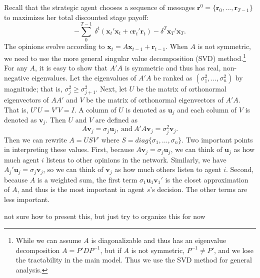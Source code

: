 \documentclass{article}
\newcommand{\x}{\mathbf{x}}
\newcommand{\re}{\mathbf{r}}
\newcommand{\ve}{\mathbf{v}}
\newcommand{\ue}{\mathbf{u}}
\newcommand{\wl}[1]{{\color{blue} #1}}
\begin{document}
Recall that the strategic agent chooses a sequence of messages $\re^0=\{\re_0,\ldots,\re_{T-1}\}$ to maximizes her total discounted stage payoff: 
$$-\sum_{0}^{T-1} \ \delta^t (\x_t' \x_t+c\re_t'\re_t)-\delta^{T}\x_T'\x_T.$$ 
The opinions evolve according to $\x_{t}=A\x_{t-1}+\re_{t-1}$. When $A$ is not symmetric, we need to use the more general singular value decomposition (SVD) method.\footnote{While we can assume $A$ is diagonalizable and thus has an eigenvalue decomposition $A=P'DP^{-1}$, but if $A$ is not symmetric, $P^{-1}\neq P'$, and we lose the tractability in the main model. Thus we use the  SVD method for general analysis.} For any $A$, it is easy to show that $A'A$ is symmetric and thus has real, non-negative eigenvalues. Let the eigenvalues of $A'A$ be ranked as $(\sigma_1^2,\ldots,\sigma_n^2)$ by magnitude; that is, $\sigma_j^2\geq \sigma_{j+1}^2$. Next, let $U$ be the matrix of orthonormal eigenvectors of $AA'$ and $V$ be the matrix of orthonormal eigenvectors of $A'A$. That is, $U'U=V'V=I$. A column of $U$ is denoted as $\ue_j$ and each column of $V$ is denoted as $\ve_j$. Then $U$ and $V$ are defined as $$A\ve_j=\sigma_j\ue_j, \ \mbox{and} \ A'A\ve_j=\sigma_j^2\ve_j.$$ Then we can rewrite $A=USV'$ where $S=diag\{\sigma_1,\ldots,\sigma_n\}$. 
Two important points in interpreting these values. First, because $A\ve_j=\sigma_j\ue_j$, we can think of $\ue_j$ as how much agent $i$ listens to other opinions in the network. Similarly, we have $A_j'\ue_j=\sigma_j\ve_j$, so we can think of $\ve_j$ as how much others listen to agent $i$. Second, because $A$ is a weighted sum, the first term $\sigma_1\ue_1\ve_1'$ is the closet approximation of $A$, and thus is the most important in agent $s$'s decision. The other terms are less important.

\wl{not sure how to present this, but just try to organize this for now}
\end{document}
